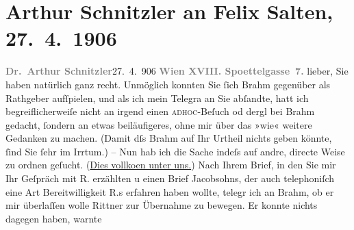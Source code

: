                \section[Arthur Schnitzler an Felix Salten, 27. 4. 1906]{ Arthur Schnitzler an Felix Salten, 27. 4. 1906}\nopagebreak{}\rehead{ }\begin{ledgroupsized}[t]{13cm}\normalsize\beginnumbering \toendnotes[C]{\smallbreak\pagebreak[2]} 
\toendnotes[C]{\smallbreak}\pstart
           \noindent{}\textcolor{gray}{\textbf{Dr. Arthur Schnitzler}}\hfill {\pb}27. 4. 906\pend
           \pstart
           \textcolor{gray}{\textbf{Wien XVIII. Spoettelgasse 7.}}\pend
           \pstart
           lieber, Sie haben natürlich ganz recht. Unmöglich konnten Sie ſich
                  Brahm gegenüber als Rathgeber aufſpielen,
               und als ich mein Telegra{\geminationm} an Sie abſandte, hatt ich
               begreiflicherweiſe nicht an irgend einen \textsc{adhoc}-Beſuch od
               dergl bei Brahm gedacht, ſondern an etwas
               beiläufigeres, ohne mir über das »wie« weitere Gedanken zu machen. (Damit dſs Brahm auf Ihr Urtheil nichts geben könnte, ſind
               Sie ſehr im Irrtum.) – Nun hab ich die Sache indeſs auf andre, directe Weise zu
               ordnen geſucht. {\pb}(\uline{Dies vollko{\geminationm}en unter uns.})
               Nach Ihrem Brief, in den Sie mir Ihr Geſpräch mit R. erzählten u einen Brief Jacobsohns,
               der auch telephoniſch eine Art Bereitwilligkeit R.s erfahren haben wollte, telegr ich an Brahm, ob er mir überlaſſen wolle Rittner zur Übernahme zu bewegen. Er konnte nichts dagegen haben, warnte

\end{ledgroupsized}
